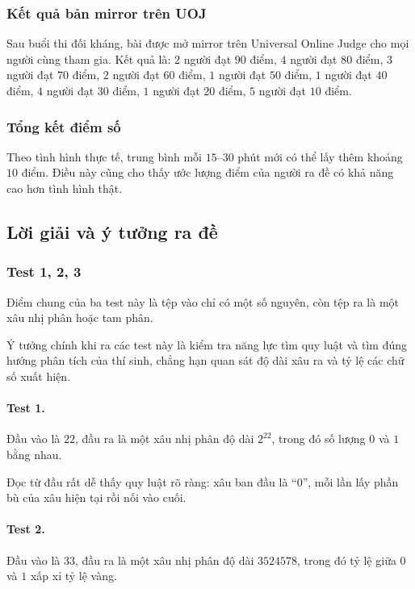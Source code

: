 \documentclass[11pt]{article}
\begin{document}
\subsubsection{Kết quả bản mirror trên UOJ}

Sau buổi thi đối kháng, bài được mở mirror trên Universal Online Judge cho mọi
người cùng tham gia. Kết quả là: \(2\) người đạt \(90\) điểm, \(4\) người đạt
\(80\) điểm, \(3\) người đạt \(70\) điểm, \(2\) người đạt \(60\) điểm,
\(1\) người đạt \(50\) điểm, \(1\) người đạt \(40\) điểm, \(4\) người đạt
\(30\) điểm, \(1\) người đạt \(20\) điểm, \(5\) người đạt \(10\) điểm.

\subsubsection{Tổng kết điểm số}

Theo tình hình thực tế, trung bình mỗi \(15\)--\(30\) phút mới có thể lấy thêm
khoảng \(10\) điểm. Điều này cũng cho thấy ước lượng điểm của người ra đề có
khả năng cao hơn tình hình thật.

\subsection{Lời giải và ý tưởng ra đề}

\subsubsection{Test 1, 2, 3}

Điểm chung của ba test này là tệp vào chỉ có một số nguyên, còn tệp ra là một
xâu nhị phân hoặc tam phân.

Ý tưởng chính khi ra các test này là kiểm tra năng lực tìm quy luật và tìm
đúng hướng phân tích của thí sinh, chẳng hạn quan sát độ dài xâu ra và tỷ lệ
các chữ số xuất hiện.

\paragraph{Test 1.}
Đầu vào là \(22\), đầu ra là một xâu nhị phân độ dài \(2^{22}\), trong đó số
lượng \(0\) và \(1\) bằng nhau.

Đọc từ đầu rất dễ thấy quy luật rõ ràng: xâu ban đầu là ``0'', mỗi lần lấy
phần bù của xâu hiện tại rồi nối vào cuối.

\paragraph{Test 2.}
Đầu vào là \(33\), đầu ra là một xâu nhị phân độ dài \(3524578\), trong đó tỷ
lệ giữa \(0\) và \(1\) xấp xỉ tỷ lệ vàng.
\end{document}
